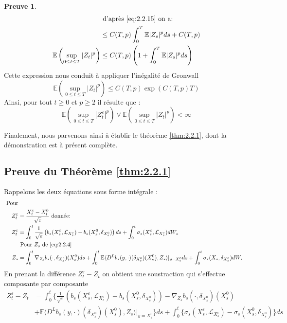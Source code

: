 \documentclass[12pt,a4paper,twoside,fleqn]{book}%
\theoremstyle{definition}
\newtheorem*{pr}{\textbf{Preuve}}
\theoremstyle{lemme}
\numberwithin{equation}{section}
\begin{document}
\begin{pr}
\[\begin{aligned}
&\text{ d'après \ref{eq:2.2.15} on a: }\\
&\leq C(T,p)\int_{0}^{T}\mathbb{E}|Z_s|^pds+C(T,p)\\
\mathbb{E}\left(\sup_{0\leq t \leq T}|Z_t|^p\right)&\leq C(T,p)\left(1 +\int_{0}^{T}\mathbb{E}|Z_s|^pds\right)
\end{aligned}
\]
Cette expression nous conduit à appliquer l’inégalité de Gronwall
\[
\mathbb{E}\left(\sup_{0\leq t \leq T}|Z_t|^p\right)\leq C(T,p)\exp(C(T,p)T)
\]
Ainsi, pour tout $t\geq0$ et $p\geq2$ il résulte que :
\[
\mathbb{E}\left(\sup_{0\leq t \leq T}|Z_t^\varepsilon|^p\right)\vee\mathbb{E}\left(\sup_{0\leq t \leq T}|Z_t|^p\right)<\infty
\]
\end{pr}
Finalement, nous parvenons ainsi à établir le théorème \ref{thm:2.2.1}, dont la démonstration est à présent complète.
\subsection{ Preuve du Théorème \ref{thm:2.2.1}}
Rappelons les deux équations sous forme intégrale :
\[\begin{aligned}
	\text{ Pour}\\
	Z_t^\varepsilon&=\frac{X_t^\varepsilon-X_t^0}{\sqrt{\varepsilon}} \text{ donnée:}\\
Z_t^\varepsilon &=\int_{0}^{t}\frac{1}{\sqrt{\varepsilon}}\left(b_s(X_s^\varepsilon,\mathcal{L}_{X_s^\varepsilon})-b_s(X_s^0,\delta_{X_s^0})\right)ds +\int_{0}^{t}\sigma_s(X_s^\varepsilon,\mathcal{L}_{X_s^\varepsilon})dW_s\\
&\text{ Pour $Z_s$ de \ref{eq:2.2.4}}\\
Z_s &= \int_{0}^{t}\nabla_{Z_s}b_s(\cdot,\delta_{X_s^0})(X_s^0)ds + \int_{0}^{t}\mathbb{E}\langle D^Lb_s(y,\cdot)(\delta_{X_s^0})(X_s^0),Z_s\rangle|_{y=X_s^0}ds + \int_{0}^{t}\sigma_s(X_s,\delta_{X_s^0})dW_s
\end{aligned}
\]
En prenant la différence $Z_t^\varepsilon-Z_t$ on obtient une soustraction qui s’effectue composante par composante
\[\begin{aligned}
Z_t^\varepsilon-Z_t &=\int_{0}^{t}\Big\{ \frac{1}{\sqrt{\varepsilon}}\left(b_s(X_s^\varepsilon,\mathcal{L}_{X_s^\varepsilon})-b_s(X_s^0,\delta_{X_s^0})\right)-\nabla_{Z_s}b_s(\cdot,\delta_{X_s^0})(X_s^0)\\&+ \mathbb{E}\langle D^Lb_s(y,\cdot)(\delta_{X_s^0})(X_s^0),Z_s\rangle|_{y=X_s^0}\Big\}ds
+\int_{0}^{t}\Big\{\sigma_s(X_s^\varepsilon,\mathcal{L}_{X_s^\varepsilon})-\sigma_s(X_s^0,\delta_{X_s^0})\Big\}ds
\end{aligned}
\]
\end{document}
